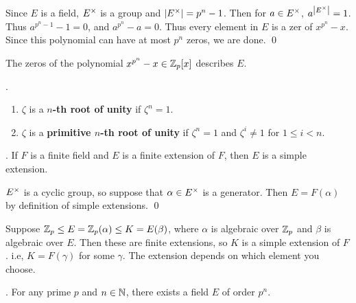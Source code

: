 \pf Since \(E\) is a field, \(E^\times\) is a group and \(\left| E^\times \right| = p^n - 1\). Then for \(a \in E^\times\), \(a^{\left| E^\times \right|} = 1\). Thus \(a^{p^n - 1} - 1 = 0\), and \(a^{p^n} - a = 0\). Thus every element in \(E\) is a zer of \(x^{p^n} - x\). Since this polynomial can have at most \(p^n\) zeros, we are done. \qed

The zeros of the polynomial \(x^{p^n} - x \in \mathbb{Z}_p[x]\) describes \(E\).

. 
\begin{enumerate}
    \item \(\zeta\) is a \textbf{\(n\)-th root of unity} if \(\zeta^n = 1\).
    \item \(\zeta\) is a \textbf{primitive \(n\)-th root of unity} if \(\zeta^n = 1\) and \(\zeta^i \neq 1\) for \(1 \leq i < n\).
\end{enumerate}

\cor. If \(F\) is a finite field and \(E\) is a finite extension of \(F\), then \(E\) is a simple extension.

\pf \(E^\times\) is a cyclic group, so suppose that \(\alpha \in E^\times\) is a generator. Then \(E = F(\alpha)\) by definition of simple extensions. \qed

Suppose \(\mathbb{Z}_p \leq E = \mathbb{Z}_p(\alpha) \leq K = E(\beta)\), where \(\alpha\) is algebraic over \(\mathbb{Z}_p\) and \(\beta\) is algebraic over \(E\). Then these are finite extensions, so \(K\) is a simple extension of \(F\). i.e, \(K = F(\gamma)\) for some \(\gamma\). The extension depends on which element you choose.

\thm. For any prime \(p\) and \(n \in \mathbb{N}\), there exists a field \(E\) of order \(p^n\).

\pagebreak
